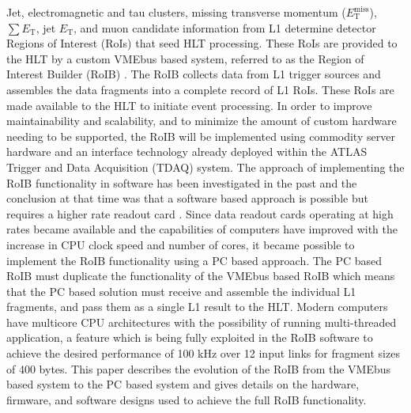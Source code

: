 Jet, electromagnetic and tau clusters, missing transverse momentum ($E_{\mathrm{T}}^{\mathrm{miss}}$), $\sum E_{\mathrm{T}}$, 
jet $E_{\mathrm{T}}$, and muon candidate information from L1 determine detector Regions of Interest (RoIs) that seed HLT processing. These RoIs are provided to the HLT by a custom VMEbus based system, referred to as the Region of Interest Builder (RoIB) \cite{vme_roib}.
The RoIB collects data from L1 
trigger sources and assembles the data fragments into a complete record of L1 RoIs. These RoIs are made available to the HLT to initiate event processing. In order to improve maintainability and scalability, and to minimize the amount of custom hardware needing to be supported, 
the RoIB will be implemented using commodity server hardware and an interface technology already deployed 
within the ATLAS Trigger and Data Acquisition (TDAQ) system. The approach of implementing the RoIB functionality in software has been investigated in the past 
and the conclusion at that time was that a software based approach is possible but requires a higher rate readout card \cite{swroib_past}. 
Since data readout cards operating at high rates became available and the capabilities of computers have improved with the increase 
in CPU clock speed and number of cores, it became possible to implement the RoIB functionality using a PC based approach. 
The PC based RoIB must duplicate the functionality of the VMEbus based RoIB which means that the PC based solution must receive and assemble the
individual L1 fragments, and pass them as a single L1 result to the HLT. Modern computers have multicore CPU architectures 
with the possibility of running multi-threaded application, a feature which is being fully exploited in the RoIB software to achieve 
the desired performance of 100 kHz over 12 input links for fragment sizes of 400 bytes.  
This paper describes the evolution of the RoIB from the VMEbus based system to the PC based system and gives details on the hardware, 
firmware, and software designs used to achieve the full RoIB functionality. 



